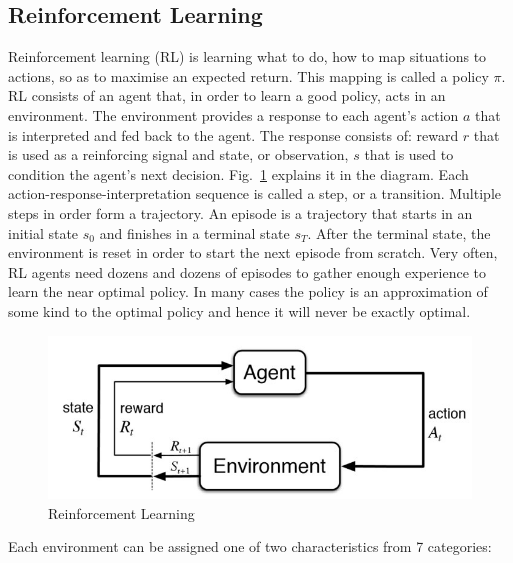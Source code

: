 \subsection{Reinforcement Learning}

Reinforcement learning (RL) is learning what to do, how to map situations to actions, so as to maximise an expected return. \cite{Book.RLAI} This mapping is called a policy $\pi$. RL consists of an agent that, in order to learn a good policy, acts in an environment. The environment provides a response to each agent's action $a$ that is interpreted and fed back to the agent. The response consists of: reward $r$ that is used as a reinforcing signal and state, or observation, $s$ that is used to condition the agent's next decision. Fig.~\ref{Fig.RL} explains it in the diagram.
Each action-response-interpretation sequence is called a step, or a transition. Multiple steps in order form a trajectory. An episode is a trajectory that starts in an initial state $s_0$ and finishes in a terminal state $s_T$. After the terminal state, the environment is reset in order to start the next episode from scratch. Very often, RL agents need dozens and dozens of episodes to gather enough experience to learn the near optimal policy. In many cases the policy is an approximation of some kind to the optimal policy and hence it will never be exactly optimal.

\begin{figure}[H]
\includegraphics[]{figures/RL.jpg}
\caption[Reinforcement Learning]{Reinforcement Learning \protect\cite{Book.RLAI}}
\label{Fig.RL}
\end{figure}

Each environment can be assigned one of two characteristics from 7 categories:

